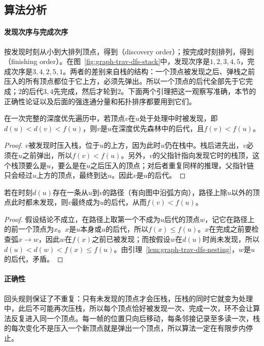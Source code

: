 \subsection{算法分析}
\label{sec:graph-trav-dfs-orders}

\paragraph{发现次序与完成次序}
按发现时刻从小到大排列顶点，得到（discovery order）；按完成时刻排列，得到（finishing order）。在图~\ref{fig:graph-trav-dfs-stack}中，发现次序是$1,2,3,4,5$，完成次序是$3,4,2,5,1$。两者的差别来自栈的结构：一个顶点被发现之后、弹栈之前压入的所有顶点都位于它上方，必须先弹出。所以一个顶点的后代全部先于它完成；$2$的后代$3,4$先完成，然后才轮到$2$。下面两个引理把这一观察写准确，本节的正确性论证以及后面的强连通分量和拓扑排序都要用到它们。

\begin{lemma}[时刻区间的嵌套]
\label{lem:graph-trav-dfs-nesting}
在一次完整的深度优先遍历中，若顶点$v$在$u$处于处理中时被发现，即$d(u)<d(v)<f(u)$，则$v$是$u$在深度优先森林中的后代，且$f(v)<f(u)$。
\end{lemma}

\begin{proof}
$v$被发现时压入栈，位于$u$的上方，因为此时$u$仍在栈中。栈后进先出，$v$必须在$u$之前弹出，所以$f(v)<f(u)$。另外，$v$的父指针指向发现它时的栈顶，这个栈顶要么是$u$，要么是在$u$之后压入的顶点；对后者重复同样的推理，父指针链只会经过$u$上方的顶点，最终到达$u$。因此$v$是$u$的后代。
\end{proof}

\begin{lemma}[未发现路径]
\label{lem:graph-trav-white-path}
若在时刻$d(u)$存在一条从$u$到$v$的路径（有向图中沿弧方向），路径上除$u$以外的顶点此时都未发现，则$v$最终成为$u$的后代，从而$f(v)<f(u)$。
\end{lemma}

\begin{proof}
假设结论不成立，在路径上取第一个不成为$u$后代的顶点$w$，记它在路径上的前一个顶点为$x$。$x$是$u$本身或$u$的后代，所以$f(x)\leq f(u)$。$x$在完成之前要检查弧$x\to w$，因此$w$在$f(x)$之前已被发现；而按假设$w$在$d(u)$时尚未发现，所以$d(u)<d(w)<f(x)\leq f(u)$。由引理~\ref{lem:graph-trav-dfs-nesting}，$w$是$u$的后代，矛盾。
\end{proof}

\paragraph{正确性}
回头规则保证了不重复：只有未发现的顶点才会压栈，压栈的同时它就变为处理中，此后不可能再次压栈，所以每个顶点恰好被发现一次、完成一次，环不会让算法反复进入同一个顶点。每一帧的位置只向后移动，每条邻接记录至多读一次，栈的每次变化不是压入一个新顶点就是弹出一个顶点，所以算法一定在有限步内停止。

